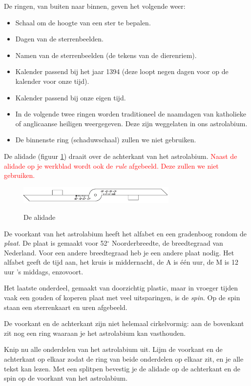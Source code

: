 De ringen, van buiten naar binnen, geven het volgende weer:
\begin{itemize}
 \item Schaal om de hoogte van een ster te bepalen.
 \item Dagen van de sterrenbeelden.
 \item Namen van de sterrenbeelden (de tekens van de dierenriem).
 \item Kalender passend bij het jaar 1394 (deze loopt negen dagen voor op de kalender voor onze tijd).
 \item Kalender passend bij onze eigen tijd.
 \item In de volgende twee ringen worden traditioneel de naamdagen van katholieke of anglicaanse heiligen weergegeven. Deze zijn weggelaten in ons astrolabium.
 \item De binnenste ring (schaduwschaal) zullen we niet gebruiken.
\end{itemize}

De alidade (figuur \ref{alidade}) draait over de achterkant van het astrolabium. \textcolor{red}{Naast de alidade op je werkblad wordt ook de \textit{rule} afgebeeld. Deze zullen we niet gebruiken.}

\begin{figure}
 \includegraphics[width=0.7\textwidth]{astrolabiumNL/alidade}
 \label{alidade}
 \caption{De alidade}
\end{figure}

De voorkant van het astrolabium heeft het alfabet en een gradenboog rondom de \textit{plaat}. De plaat is gemaakt voor 52$^\circ$ Noorderbreedte, de breedtegraad van Nederland. Voor een andere breedtegraad heb je een andere plaat nodig. Het alfabet geeft de tijd aan, het kruis \kreuz is middernacht, de A is \'e\'en uur, de M is 12 uur 's middags, enzovoort.

Het laatste onderdeel, gemaakt van doorzichtig plastic, maar in vroeger tijden vaak een gouden of koperen plaat met veel uitsparingen, is de \textit{spin}. Op de spin staan een sterrenkaart en uren afgebeeld. 

De voorkant en de achterkant zijn niet helemaal cirkelvormig: aan de bovenkant zit nog een ring waaraan je het astrolabium kan vasthouden.

\begin{opgave}[\schaar]
 Knip nu alle onderdelen van het astrolabium uit. Lijm de voorkant en de achterkant op elkaar zodat de ring van beide onderdelen op elkaar zit, en je alle tekst kan lezen. Met een splitpen bevestig je de alidade op de achterkant en de spin op de voorkant van het astrolabium.
\end{opgave}
